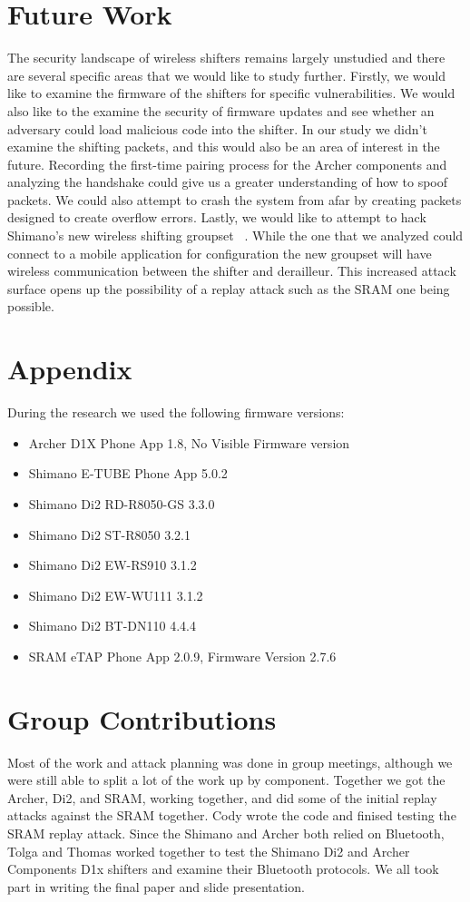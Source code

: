 \documentclass[letterpaper,twocolumn,10pt]{article}
\begin{document}
\section{Future Work}

The security landscape of wireless shifters remains largely unstudied and there are several specific areas that we would like to study further. Firstly, we would like to examine the firmware of the shifters for specific vulnerabilities. We would also like to the examine the security of firmware updates and see whether an adversary could load malicious code into the shifter. In our study we didn’t examine the shifting packets, and this would also be an area of interest in the future. Recording the first-time pairing process for the Archer components and analyzing the handshake could give us a greater understanding of how to spoof packets. We could also attempt to crash the system from afar by creating packets designed to create overflow errors. Lastly, we would like to attempt to hack Shimano’s new wireless shifting groupset~ \cite{newshimano}. While the one that we analyzed could connect to a mobile application for configuration the new groupset will have wireless communication between the shifter and derailleur. This increased attack surface opens up the possibility of a replay attack such as the SRAM one being possible.


  {\normalsize 
    }


\section{Appendix}
During the research we used the following firmware versions:
\begin{itemize}
  \item Archer D1X Phone App 1.8, No Visible Firmware version
  \item Shimano E-TUBE Phone App 5.0.2
  \item Shimano Di2 RD-R8050-GS 3.3.0
  \item Shimano Di2 ST-R8050 3.2.1
  \item Shimano Di2 EW-RS910 3.1.2
  \item Shimano Di2 EW-WU111 3.1.2
  \item Shimano Di2 BT-DN110 4.4.4 
  \item SRAM eTAP Phone App 2.0.9, Firmware Version 2.7.6
\end{itemize}
\section{Group Contributions}

Most of the work and attack planning was done in group meetings, although we were still able to split a lot of the work up by component. Together we got the Archer, Di2, and SRAM, working together, and did some of the initial replay attacks against the SRAM together. Cody wrote the code and finised testing the SRAM replay attack. Since the Shimano and Archer both relied on Bluetooth, Tolga and Thomas worked together to test the Shimano Di2 and Archer Components D1x shifters and examine their Bluetooth protocols. We all took part in writing the final paper and slide presentation.

\end{document}
